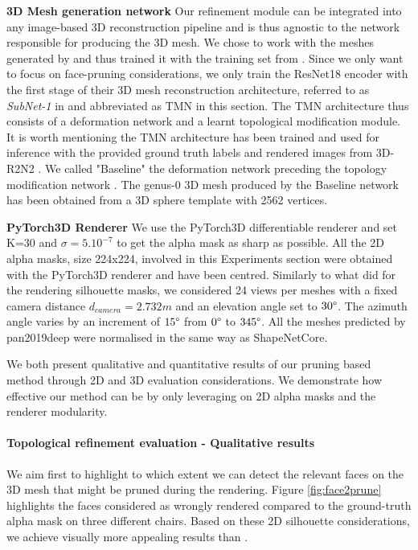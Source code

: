 \noindent\textbf{3D Mesh generation network} Our refinement module can be integrated into any image-based 3D reconstruction pipeline and is thus agnostic to the network responsible for producing the 3D mesh. We chose to work with the meshes generated by \citep{pan2019deep} and thus trained it with the training set from \citep{chang2015shapenet}. Since we only want to focus on face-pruning considerations, we only train the ResNet18 encoder with the first stage of their 3D mesh reconstruction architecture, referred to as \textit{SubNet-1} in \citep{pan2019deep} and abbreviated as TMN in this section. The TMN architecture thus consists of a deformation network and a learnt topological modification module. It is worth mentioning the TMN \citep{pan2019deep} architecture has been trained and used for inference with the provided ground truth labels and rendered images from 3D-R2N2 \citep{choy20163d}. We called "Baseline" the deformation network preceding the topology modification network \citep{pan2019deep}. The genus-0 3D mesh produced by the Baseline network has been obtained from a 3D sphere template with 2562 vertices. 


\noindent\textbf{PyTorch3D Renderer} We use the PyTorch3D \citep{nie2020total3dunderstanding} differentiable renderer and set K=30 and $\sigma=5.10^{-7}$ to get the alpha mask as sharp as possible. All the 2D alpha masks, size 224x224, involved in this Experiments section were obtained with the PyTorch3D renderer and have been centred. Similarly to what \citep{choy20163d,liu1029soft,yan2016perspective} did for the rendering silhouette masks, we considered 24 views per meshes with a fixed camera distance $d_{camera}=2.732m$ and an elevation angle set to $30\degree$. The azimuth angle varies by an increment of $15\degree$ from $0\degree$ to $345\degree$. All the meshes predicted by pan2019deep \citep{pan2019deep} were normalised in the same way as ShapeNetCore\citep{chang2015shapenet}. 

We both present qualitative and quantitative results of our pruning based method through 2D and 3D evaluation considerations. We demonstrate how effective our method can be by only leveraging on 2D alpha masks and the renderer modularity. 

\paragraph{Topological refinement evaluation - Qualitative results}

We aim first to highlight to which extent we can detect the relevant faces on the 3D mesh that might be pruned during the rendering. Figure \ref{fig:face2prune} highlights the faces considered as wrongly rendered compared to the ground-truth alpha mask on three different chairs. Based on these 2D silhouette considerations, we achieve visually more appealing results than \citep{pan2019deep}. 

